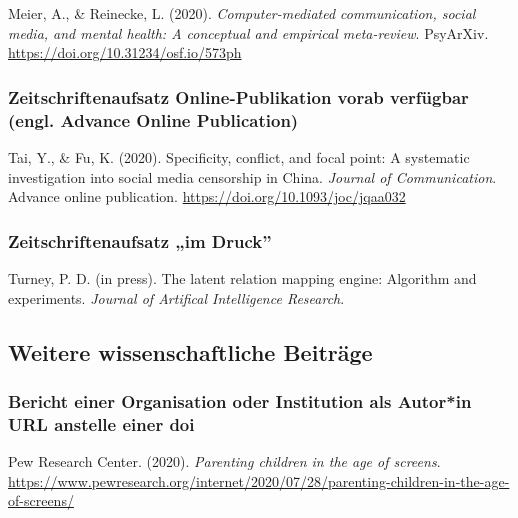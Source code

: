 \documentclass[
  letterpaper,
  DIV=11]{scrreprt}
\begin{document}
Meier, A., \& Reinecke, L. (2020). \emph{Computer-mediated
communication, social media, and mental health: A conceptual and
empirical meta-review}. PsyArXiv.
\url{https://doi.org/10.31234/osf.io/573ph}

\hypertarget{zeitschriftenaufsatz-online-publikation-vorab-verfuxfcgbar-engl.-advance-online-publication}{%
\subsubsection{Zeitschriftenaufsatz \textbar{} Online-Publikation vorab
verfügbar (engl. Advance Online
Publication)}\label{zeitschriftenaufsatz-online-publikation-vorab-verfuxfcgbar-engl.-advance-online-publication}}

Tai, Y., \& Fu, K. (2020). Specificity, conflict, and focal point: A
systematic investigation into social media censorship in China.
\emph{Journal of Communication}. Advance online publication.
\url{https://doi.org/10.1093/joc/jqaa032}

\hypertarget{zeitschriftenaufsatz-im-druck}{%
\subsubsection{Zeitschriftenaufsatz \textbar{} „im
Druck''}\label{zeitschriftenaufsatz-im-druck}}

Turney, P. D. (in press). The latent relation mapping engine: Algorithm
and experiments. \emph{Journal of Artifical Intelligence Research}.

\hypertarget{weitere-wissenschaftliche-beitruxe4ge}{%
\subsection{Weitere wissenschaftliche
Beiträge}\label{weitere-wissenschaftliche-beitruxe4ge}}

\hypertarget{bericht-einer-organisation-oder-institution-als-autorin-url-anstelle-einer-doi}{%
\subsubsection{Bericht einer Organisation oder Institution als Autor*in
\textbar{} URL anstelle einer
doi}\label{bericht-einer-organisation-oder-institution-als-autorin-url-anstelle-einer-doi}}

Pew Research Center. (2020). \emph{Parenting children in the age of
screens}.
\url{https://www.pewresearch.org/internet/2020/07/28/parenting-children-in-the-age-of-screens/}
\end{document}
